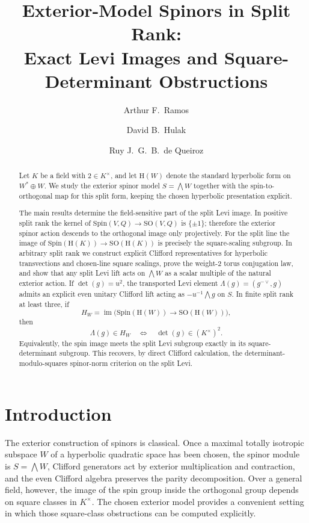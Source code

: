 \documentclass{birkjour}
\title[Exterior-Model Spinors in Split Rank]
      {Exterior-Model Spinors in Split Rank:\\
       Exact Levi Images and Square-Determinant Obstructions}
\author{Arthur F.~Ramos}
\author{David B.~Hulak}
\author{Ruy J.~G.~B.~de Queiroz}
\date{}
\theoremstyle{plain}
\theoremstyle{definition}
\theoremstyle{remark}
\numberwithin{equation}{section}
\newcommand{\Spin}{\mathrm{Spin}}
\newcommand{\SO}{\mathrm{SO}}
\newcommand{\Hyp}{\mathrm{H}}
\begin{document}
\begin{abstract}
Let \(K\) be a field with \(2\in K^\times\), and let
\(\Hyp(W)\) denote the standard hyperbolic form on \(W^*\oplus W\). We study
the exterior spinor model \(S=\bigwedge W\) together with the spin-to-orthogonal
map for this split form, keeping the chosen hyperbolic presentation explicit.

The main results determine the field-sensitive part of the split Levi image. In
positive split rank the kernel of \(\Spin(V,Q)\to\SO(V,Q)\) is \(\{\pm1\}\);
therefore the exterior spinor action descends to the orthogonal image only
projectively. For the split line the image of
\(\Spin(\Hyp(K))\to\SO(\Hyp(K))\) is precisely the square-scaling
subgroup. In arbitrary split rank we construct explicit Clifford representatives
for hyperbolic transvections and chosen-line square scalings, prove the
weight-\(2\) torus conjugation law, and show that any split Levi lift acts on
\(\bigwedge W\) as a scalar multiple of the natural exterior action. If
\(\det(g)=u^2\), the transported Levi element
\(\Lambda(g)=(g^{-{\vee}},g)\) admits an explicit even unitary Clifford lift
acting as \(-u^{-1}\bigwedge g\) on \(S\). In finite split rank at least three,
if
\[
  H_W=\operatorname{im}\bigl(\Spin(\Hyp(W))\to\SO(\Hyp(W))\bigr),
\]
then
\[
  \Lambda(g)\in H_W
  \quad\Longleftrightarrow\quad
  \det(g)\in (K^\times)^2.
\]
Equivalently, the spin image meets the split Levi subgroup exactly in its
square-determinant subgroup. This recovers, by direct Clifford calculation, the
determinant-modulo-squares spinor-norm criterion on the split Levi.
\end{abstract}

\maketitle

\section{Introduction}
\label{sec:intro}

The exterior construction of spinors is classical. Once a maximal totally
isotropic subspace \(W\) of a hyperbolic quadratic space has been chosen, the
spinor module is \(S=\bigwedge W\), Clifford generators act by exterior
multiplication and contraction, and the even Clifford algebra preserves the
parity decomposition. Over a general field, however, the image of the spin group
inside the orthogonal group depends on square classes in \(K^\times\). The
chosen exterior model provides a convenient setting in which those square-class
obstructions can be computed explicitly.
\end{document}
